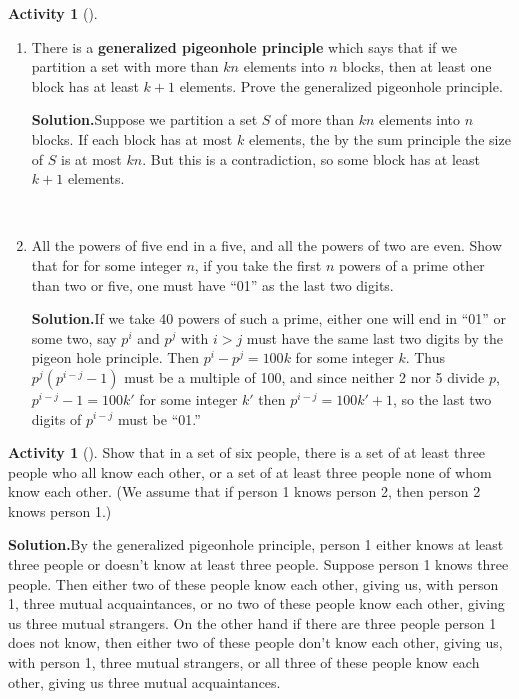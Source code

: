 \documentclass[10pt,]{book}
\newcommand{\terminology}[1]{\textbf{#1}}
\theoremstyle{plain}
\theoremstyle{definition}
\newtheorem{activity}[project]{Activity}
\numberwithin{equation}{chapter}
\begin{document}
\begin{activity}[]\label{activity-63}
~\par
\begin{enumerate}[label=(\alph*)]
 \item There is a \terminology{generalized pigeonhole principle} which says that if we partition a set with more than \(kn\) elements into \(n\) blocks, then at least one block has at least \(k+1\) elements. Prove the generalized pigeonhole principle.%
\par\medskip\noindent%
\textbf{Solution.}\quad Suppose we partition a set \(S\) of more than \(kn\) elements into \(n\) blocks. If each block has at most \(k\) elements, the by the sum principle the size of \(S\) is at most \(kn\). But this is a contradiction, so some block has at least \(k+1\) elements.%

~\par
\item All the powers of five end in a five, and all the powers of two are even. Show that for for some integer \(n\), if you take the first \(n\) powers of a prime other than two or five, one must have ``01'' as the last two digits.%
\par\medskip\noindent%
\textbf{Solution.}\quad If we take 40 powers of such a prime, either one will end in ``01'' or some two, say \(p^i\) and \(p^j\) with \(i>j\) must have the same last two digits by the pigeon hole principle. Then \(p^i-p^j=100k\) for some integer \(k\). Thus \(p^j(p^{i-j} -1)\) must be a multiple of 100, and since neither 2 nor 5 divide \(p\), \(p^{i-j} -1 = 100k'\) for some integer \(k'\) then \(p^{i-j} = 100k'+1\), so the last two digits of \(p^{i-j}\) must be ``01.''%

\end{enumerate}
\end{activity}
\begin{activity}[]\label{R_3_3_}
Show that in a set of six people, there is a set of at least three people who all know each other, or a set of at least three people none of whom know each other. (We assume that if person 1 knows person 2, then person 2 knows person 1.)%
\par\medskip\noindent%
\textbf{Solution.}\quad By the generalized pigeonhole principle, person 1 either knows at least three people or doesn't know at least three people. Suppose person 1 knows three people. Then either two of these people know each other, giving us, with person 1, three mutual acquaintances, or no two of these people know each other, giving us three mutual strangers. On the other hand if there are three people person 1 does not know, then either two of these people don't know each other, giving us, with person 1, three mutual strangers, or all three of these people know each other, giving us three mutual acquaintances.%
\end{activity}
\end{document}

